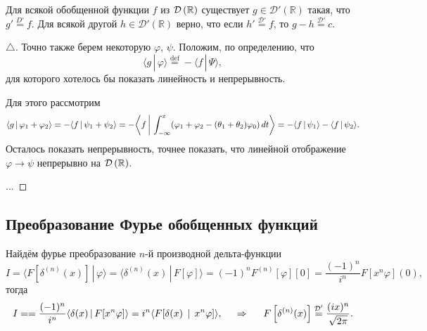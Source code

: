 \begin{to_thr}[]
    Для всякой обобщенной функции $f$ из $\mathcal D\left(\mathbb{R}\right)$ существует $g \in \mathcal D' (\mathbb{R})$ такая, что $g' \overset{D'}{=}  f$. Для всякой другой $h \in \mathcal D'\left(\mathbb{R}\right)$ верно, что  если $h' \overset{\mathcal D'}{=} f$, то $g - h \overset{\mathcal D'}{=} c$.
\end{to_thr}

\begin{proof}[$\triangle$]
    Точно также берем некоторую $\varphi$, $\psi$. Положим, по определению, что 
    \begin{equation*}
        \langle g \,|\, \varphi \rangle \overset{\mathrm{def}}{=} - \langle f \,|\, \Psi \rangle ,
    \end{equation*}
    для которого хотелось бы показать линейность и непрерывность. 

Для этого рассмотрим
\begin{equation*}
    \langle g \,|\, \varphi_1 + \varphi_2 \rangle = - \langle f \,|\, \psi_1 + \psi_2 \rangle =
    - \bigg\langle f \,\bigg|\, \int_{-\infty}^{x} (\varphi_1 + \varphi_2 - (\theta_1 + \theta_2) \varphi_0) \, d t \bigg\rangle = - \langle f \,|\, \psi_1 \rangle- \langle f \,|\, \psi_2 \rangle.
\end{equation*}
Осталось показать непрерывность, точнее показать, что линейной отображение $\varphi \to \psi$ непрерывно на $\mathcal D\left(\mathbb{R}\right)$.

...

\end{proof}



\subsection{Преобразование Фурье обобщенных функций}




Найдём фурье преобразование $n$-й производной дельта-функции
\begin{equation*}
    I = \langle F[\delta^{(n)} (x)] \,|\, \varphi \rangle = \langle \delta^{(n)} (x) \,|\, F[\varphi] \rangle  = (-1)^n F^{(n)} [\varphi][0] = 
    \frac{(-1)^n}{i^n} F[x^n \varphi](0),
\end{equation*}
тогда
\begin{equation*}
    I = = 
    \frac{(-1)^n}{i^n} \langle \delta(x) \,|\, F[x^n \varphi] \rangle = i^n \langle F[\delta(x) \,\mid\, x^n \varphi]\rangle,
    \hspace{0.5cm} \Rightarrow \hspace{0.5cm}
    F\left[\delta^{(n)} (x)\right] \overset{\mathcal D'}{=} \frac{(ix)^n}{\sqrt{2\pi}}.
\end{equation*}
 
